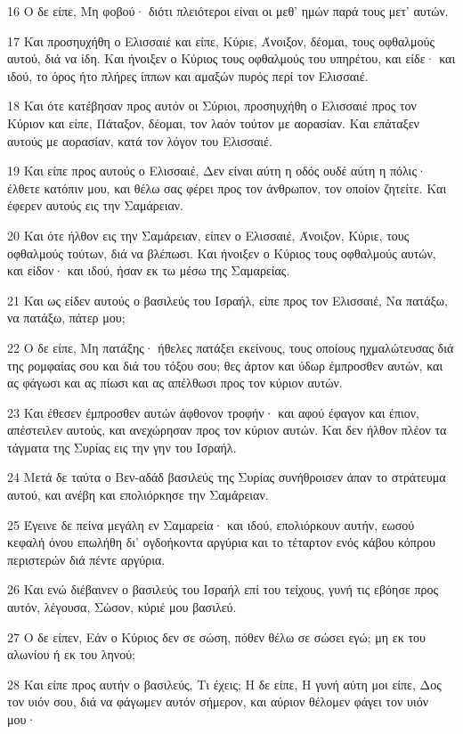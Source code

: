 \par 16 Ο δε είπε, Μη φοβού· διότι πλειότεροι είναι οι μεθ' ημών παρά τους μετ' αυτών.
\par 17 Και προσηυχήθη ο Ελισσαιέ και είπε, Κύριε, Άνοιξον, δέομαι, τους οφθαλμούς αυτού, διά να ίδη. Και ήνοιξεν ο Κύριος τους οφθαλμούς του υπηρέτου, και είδε· και ιδού, το όρος ήτο πλήρες ίππων και αμαξών πυρός περί τον Ελισσαιέ.
\par 18 Και ότε κατέβησαν προς αυτόν οι Σύριοι, προσηυχήθη ο Ελισσαιέ προς τον Κύριον και είπε, Πάταξον, δέομαι, τον λαόν τούτον με αορασίαν. Και επάταξεν αυτούς με αορασίαν, κατά τον λόγον του Ελισσαιέ.
\par 19 Και είπε προς αυτούς ο Ελισσαιέ, Δεν είναι αύτη η οδός ουδέ αύτη η πόλις· έλθετε κατόπιν μου, και θέλω σας φέρει προς τον άνθρωπον, τον οποίον ζητείτε. Και έφερεν αυτούς εις την Σαμάρειαν.
\par 20 Και ότε ήλθον εις την Σαμάρειαν, είπεν ο Ελισσαιέ, Άνοιξον, Κύριε, τους οφθαλμούς τούτων, διά να βλέπωσι. Και ήνοιξεν ο Κύριος τους οφθαλμούς αυτών, και είδον· και ιδού, ήσαν εκ τω μέσω της Σαμαρείας.
\par 21 Και ως είδεν αυτούς ο βασιλεύς του Ισραήλ, είπε προς τον Ελισσαιέ, Να πατάξω, να πατάξω, πάτερ μου;
\par 22 Ο δε είπε, Μη πατάξης· ήθελες πατάξει εκείνους, τους οποίους ηχμαλώτευσας διά της ρομφαίας σου και διά του τόξου σου; θες άρτον και ύδωρ έμπροσθεν αυτών, και ας φάγωσι και ας πίωσι και ας απέλθωσι προς τον κύριον αυτών.
\par 23 Και έθεσεν έμπροσθεν αυτών άφθονον τροφήν· και αφού έφαγον και έπιον, απέστειλεν αυτούς, και ανεχώρησαν προς τον κύριον αυτών. Και δεν ήλθον πλέον τα τάγματα της Συρίας εις την γην του Ισραήλ.
\par 24 Μετά δε ταύτα ο Βεν-αδάδ βασιλεύς της Συρίας συνήθροισεν άπαν το στράτευμα αυτού, και ανέβη και επολιόρκησε την Σαμάρειαν.
\par 25 Έγεινε δε πείνα μεγάλη εν Σαμαρεία· και ιδού, επολιόρκουν αυτήν, εωσού κεφαλή όνου επωλήθη δι' ογδοήκοντα αργύρια και το τέταρτον ενός κάβου κόπρου περιστερών διά πέντε αργύρια.
\par 26 Και ενώ διέβαινεν ο βασιλεύς του Ισραήλ επί του τείχους, γυνή τις εβόησε προς αυτόν, λέγουσα, Σώσον, κύριέ μου βασιλεύ.
\par 27 Ο δε είπεν, Εάν ο Κύριος δεν σε σώση, πόθεν θέλω σε σώσει εγώ; μη εκ του αλωνίου ή εκ του ληνού;
\par 28 Και είπε προς αυτήν ο βασιλεύς, Τι έχεις; Η δε είπε, Η γυνή αύτη μοι είπε, Δος τον υιόν σου, διά να φάγωμεν αυτόν σήμερον, και αύριον θέλομεν φάγει τον υιόν μου·
